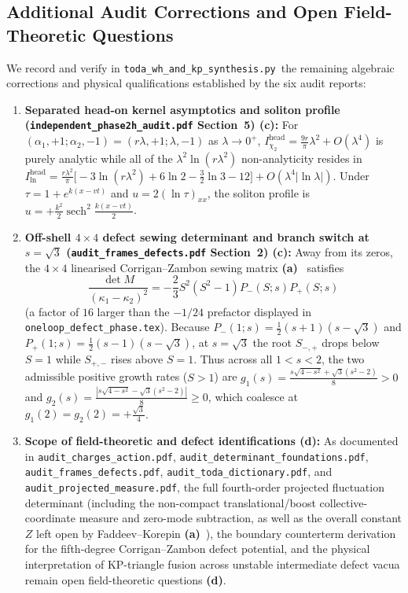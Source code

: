 \documentclass[11pt,a4paper]{article}
\newcommand{\La}{\textsf{\textbf{(a)}}}
\newcommand{\Lc}{\textsf{\textbf{(c)}}}
\newcommand{\Ld}{\textsf{\textbf{(d)}}}
\newcommand{\scrshort}{\texttt{toda\_\allowbreak wh\_\allowbreak and\_\allowbreak kp\_\allowbreak synthesis.py}}
\theoremstyle{remark}
\begin{document}
\subsection{Additional Audit Corrections and Open Field-Theoretic Questions}
We record and verify in \scrshort\ the remaining algebraic corrections
and physical qualifications established by the six audit reports:
\begin{enumerate}
\item \textbf{Separated head-on kernel asymptotics and soliton profile (\texttt{independent\_\allowbreak phase2h\_\allowbreak audit.pdf} Section~5) \Lc:}
  For $(\alpha_1,+1;\alpha_2,-1) = (r\lambda,+1;\lambda,-1)$ as $\lambda\to 0^+$,
  $I_{\chi_2}^{\mathrm{head}} = \frac{9r}{\pi}\lambda^2 + O(\lambda^4)$ is purely analytic while all of
  the $\lambda^2\ln(r\lambda^2)$ non-analyticity resides in
  $I_{\ln}^{\mathrm{head}} = \frac{r\lambda^2}{\pi}\big[-3\ln(r\lambda^2)+6\ln 2-\frac{3}{2}\ln 3-12\big] + O(\lambda^4|\ln\lambda|)$.
  Under $\tau = 1 + e^{k(x-vt)}$ and $u = 2(\ln\tau)_{xx}$, the soliton profile is
  $u = +\frac{k^2}{2}\operatorname{sech}^2\frac{k(x-vt)}{2}$.
\item \textbf{Off-shell $4\times 4$ defect sewing determinant and branch switch at $s = \sqrt{3}$ (\texttt{audit\_\allowbreak frames\_\allowbreak defects.pdf} Section~2) \Lc:}
  Away from its zeros, the $4\times 4$ linearised Corrigan--Zambon sewing matrix \La~\cite{CZ} satisfies
  \[
    \frac{\det M}{(\kappa_1 - \kappa_2)^2} = -\frac{2}{3}S^2(S^2-1)P_-(S;s)P_+(S;s)
  \]
  (a factor of $16$ larger than the $-1/24$ prefactor displayed in \texttt{oneloop\_defect\_phase.tex}).
  Because $P_-(1;s) = \frac{1}{2}(s+1)(s-\sqrt{3})$ and $P_+(1;s) = \frac{1}{2}(s-1)(s-\sqrt{3})$,
  at $s = \sqrt{3}$ the root $S_{-,+}$ drops below $S = 1$ while $S_{+,-}$ rises above $S = 1$.
  Thus across all $1 < s < 2$, the two admissible positive growth rates ($S > 1$) are
  $g_1(s) = \frac{s\sqrt{4-s^2}+\sqrt{3}(s^2-2)}{8} > 0$ and
  $g_2(s) = \frac{|s\sqrt{4-s^2}-\sqrt{3}(s^2-2)|}{8} \ge 0$, which coalesce at $g_1(2) = g_2(2) = +\frac{\sqrt{3}}{4}$.
\item \textbf{Scope of field-theoretic and defect identifications \Ld:}
  As documented in \texttt{audit\_\allowbreak charges\_\allowbreak action.pdf},
  \texttt{audit\_\allowbreak determinant\_\allowbreak foundations.pdf},
  \texttt{audit\_\allowbreak frames\_\allowbreak defects.pdf},
  \texttt{audit\_\allowbreak toda\_\allowbreak dictionary.pdf}, and
  \texttt{audit\_\allowbreak projected\_\allowbreak measure.pdf}, the full fourth-order projected fluctuation determinant
  (including the non-compact translational/boost collective-coordinate measure and zero-mode subtraction,
  as well as the overall constant $Z$ left open by Faddeev--Korepin \La~\cite{FK}),
  the boundary counterterm derivation for the fifth-degree Corrigan--Zambon defect potential,
  and the physical interpretation of KP-triangle fusion across unstable intermediate defect vacua
  remain open field-theoretic questions \Ld.
\end{enumerate}
\end{document}
